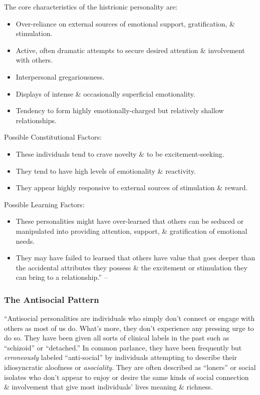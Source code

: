 \documentclass{article}
\numberwithin{equation}{section}
\begin{document}
The core characteristics of the histrionic personality are:
\begin{itemize}
	\item Over-reliance on external sources of emotional support, gratification, \& stimulation.
	\item Active, often dramatic attempts to secure desired attention \& involvement with others.
	\item Interpersonal gregariousness.
	\item Displays of intense \& occasionally superficial emotionality.
	\item Tendency to form highly emotionally-charged but relatively shallow relationships.
\end{itemize}
Possible Constitutional Factors:
\begin{itemize}
	\item These individuals tend to crave novelty \& to be excitement-seeking.
	\item They tend to have high levels of emotionality \& reactivity.
	\item They appear highly responsive to external sources of stimulation \& reward.
\end{itemize}
Possible Learning Factors:
\begin{itemize}
	\item These personalities might have over-learned that others can be seduced or manipulated into providing attention, support, \& gratification of emotional needs.
	\item They may have failed to learned that others have value that goes deeper than the accidental attributes they possess \& the excitement or stimulation they can bring to a relationship.'' -- \cite[pp. 59--61]{Simon2011}
\end{itemize}

\subsubsection{The Antisocial Pattern}
``Antisocial personalities are individuals who simply don't connect or engage with others as most of us do. What's more, they don't experience any pressing urge to do so. They have been given all sorts of clinical labels in the past such as ``schizoid'' or ``detached.'' In common parlance, they have been frequently but \textit{erroneously} labeled ``anti-social'' by individuals attempting to describe their idiosyncratic aloofness or \textit{asociality}. They are often described as ``loners'' or social isolates who don't appear to enjoy or desire the same kinds of social connection \& involvement that give most individuals' lives meaning \& richness.
\end{document}
